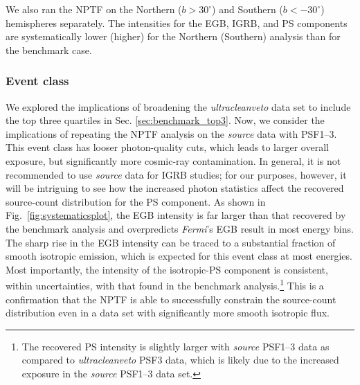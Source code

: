 We also ran the NPTF on the Northern ($b > 30^\circ$) and Southern ($b < -30^\circ$) hemispheres separately.  The intensities for the EGB, IGRB, and PS components are systematically lower (higher) for the Northern (Southern) analysis than for the benchmark case.  %



\subsubsection{Event class}

We explored the implications of broadening the {\it ultracleanveto} data set to include the top three quartiles in Sec. \ref{sec:benchmark_top3}.   Now, we consider the implications of repeating the NPTF analysis on the {\it source} data with PSF1--3.  This event class has looser photon-quality cuts, which leads to larger overall exposure, but significantly more cosmic-ray contamination.  In general, it is not recommended to use {\it source} data for IGRB studies; for our purposes, however, it will be intriguing to see how the increased photon statistics affect the recovered source-count distribution for the PS component.  As shown in Fig.~\ref{fig:systematicsplot}, the EGB intensity is far larger than that recovered by the benchmark analysis and overpredicts \emph{Fermi}'s EGB result in most energy bins.  The sharp rise in the EGB intensity can be traced to a substantial fraction of smooth isotropic emission, which is expected for this event class at most energies.  Most importantly, the intensity of the isotropic-PS component is consistent, within uncertainties, with that found in the benchmark analysis.\footnote{The recovered PS intensity is slightly larger with {\it source} PSF1--3 data as compared to {\it ultracleanveto} PSF3 data, which is likely due to the increased exposure in the {\it source} PSF1--3 data set. 
}   This is a  confirmation that the NPTF is able to successfully constrain the source-count distribution even in a data set with significantly more smooth isotropic flux.  


